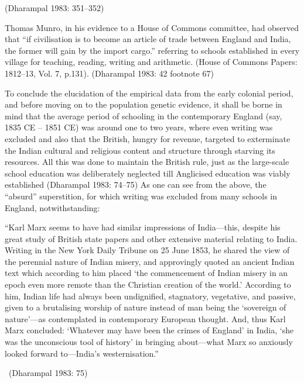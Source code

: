 \vspace{-.7cm}

\begin{flushright}
(Dharampal 1983: 351–352)
\end{flushright}

Thomas Munro, in his evidence to a House of Commons committee, had observed that “if civilisation is to become an article of trade between England and India, the former will gain by the import cargo.” referring to schools established in every village for teaching, reading, writing and arithmetic. (House of Commons Papers: 1812–13, Vol. 7, p.131). (Dharampal 1983: 42 footnote 67)

To conclude the elucidation of the empirical data from the early colonial period, and before moving on to the population genetic evidence, it shall be borne in mind that the average period of schooling in the contemporary England (say, 1835 CE – 1851 CE) was around one to two years, where even writing was excluded and also that the British, hungry for revenue, targeted to exterminate the Indian cultural and religious content and structure through starving its resources. All this was done to maintain the British rule, just as the large-scale school education was deliberately neglected till Anglicised education was viably established (Dharampal 1983: 74–75) As one can see from the above, the “absurd” superstition, for which writing was excluded from many schools in England, notwithstanding:

\begin{myquote}
“Karl Marx seems to have had similar impressions of India—this, despite his great study of British state papers and other extensive material relating to India. Writing in the New York Daily Tribune on 25 June 1853, he shared the view of the perennial nature of Indian misery, and approvingly quoted an ancient Indian text which according to him placed ‘the commencement of Indian misery in an epoch even more remote than the Christian creation of the world.’ According to him, Indian life had always been undignified, stagnatory, vegetative, and passive, given to a brutalising worship of nature instead of man being the ‘sovereign of nature’—as contemplated in contemporary European thought. And, thus Karl Marx concluded: ‘Whatever may have been the crimes of England’ in India, ‘she was the unconscious tool of history’ in bringing about—what Marx so anxiously looked forward to—India’s westernisation.” 

~\hfill (Dharampal 1983: 75)
\end{myquote}

